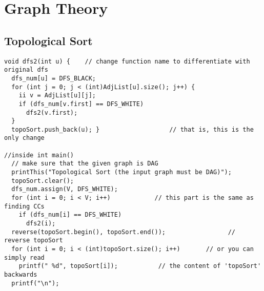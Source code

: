 \documentclass[letterpaper]{article}
\begin{document}
\section{Graph Theory}
\subsection{Topological Sort}
\begin{lstlisting}
void dfs2(int u) {    // change function name to differentiate with original dfs
  dfs_num[u] = DFS_BLACK;
  for (int j = 0; j < (int)AdjList[u].size(); j++) {
    ii v = AdjList[u][j];
    if (dfs_num[v.first] == DFS_WHITE)
      dfs2(v.first);
  }
  topoSort.push_back(u); }                   // that is, this is the only change

//inside int main()
  // make sure that the given graph is DAG
  printThis("Topological Sort (the input graph must be DAG)");
  topoSort.clear();
  dfs_num.assign(V, DFS_WHITE);
  for (int i = 0; i < V; i++)            // this part is the same as finding CCs
    if (dfs_num[i] == DFS_WHITE)
      dfs2(i);
  reverse(topoSort.begin(), topoSort.end());                 // reverse topoSort
  for (int i = 0; i < (int)topoSort.size(); i++)       // or you can simply read
    printf(" %d", topoSort[i]);           // the content of 'topoSort' backwards
  printf("\n");
\end{lstlisting}
\end{document}
